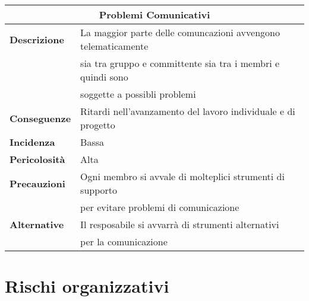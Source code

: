 \begin{center}
    \begin{tabularx}{0.8\linewidth}{l|l}
        \multicolumn{2}{c}{\textbf{Problemi Comunicativi}}                                                      \\
        \hline{\textbf{Descrizione}}    & La maggior parte delle comuncazioni avvengono telematicamente         \\
                                        & sia tra gruppo e committente sia tra i membri e quindi sono           \\
                                        & soggette a possibli problemi                                          \\                                 
        \textbf{Conseguenze}            & Ritardi nell'avanzamento del lavoro individuale e di progetto         \\
        \textbf{Incidenza}              & Bassa                                                                 \\
        \textbf{Pericolosità}           & Alta                                                                  \\
        \textbf{Precauzioni}            & Ogni membro si avvale di molteplici strumenti di supporto             \\
                                        & per evitare problemi di comunicazione                                 \\
        \textbf{Alternative}            & Il resposabile si avvarrà di strumenti alternativi                    \\ 
                                        & per la comunicazione                                                  \\ 
    \end{tabularx}
\end{center}


\section{Rischi organizzativi}

